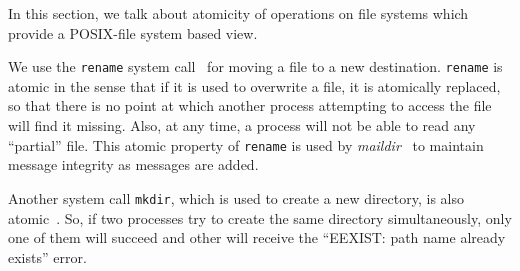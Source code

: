 In this section, we talk about atomicity of operations on file systems which provide a POSIX-file system based view.

We use the \texttt{rename} system call~\cite{renamemanpage} for moving a file to a new destination. \texttt{rename} is atomic in the sense that if it is used to overwrite a file, it is atomically replaced, so that there is no point at which another process attempting to access the file will find it missing. Also, at any time, a process will not be able to read any ``partial'' file. This atomic property of \texttt{rename} is used by \textit{maildir}~\cite{bernstein1995using}
to maintain message integrity as messages are added.

Another system call \texttt{mkdir}, which is used to create a new directory, is also atomic~\cite{mkdirposix}. So, if two processes try to create the same directory simultaneously, only one of them will succeed and other will receive the ``EEXIST: path name already exists'' error.
